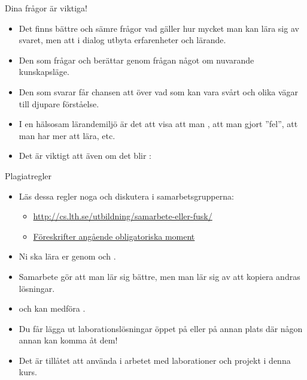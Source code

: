 \begin{SlideExtra}{Dina frågor är viktiga!}
\begin{itemize}
\item Det finns bättre och sämre frågor vad gäller hur mycket man kan lära sig av svaret, men  att i dialog utbyta erfarenheter och lärande.
\item Den som frågar  och berättar genom frågan något om nuvarande kunskapsläge.
\item Den som svarar får chansen att  över vad som kan vara svårt och olika vägar till djupare förståelse.
\item I en hälsosam lärandemiljö är det  att visa att man , att man gjort ''fel'', att man har mer att lära, etc.
\item Det är viktigt att  även om det blir :\\ 
\end{itemize}
\end{SlideExtra}

\begin{SlideExtra}{Plagiatregler}
\begin{itemize}
\item Läs dessa regler noga och diskutera i samarbetsgrupperna:

\begin{itemize}
\footnotesize
\item \url{http://cs.lth.se/utbildning/samarbete-eller-fusk/}
\item \href{http://cs.lth.se/utbildning/foereskrifter-angaaende-obligatoriska-moment/}{Föreskrifter angående obligatoriska moment}
\end{itemize}
\item Ni ska lära er genom  och  .
\item Samarbete gör att man lär sig bättre, men man lär sig  av att kopiera andras lösningar.
\item {} och kan medföra .
\item Du får  lägga ut laborationslösningar öppet på  eller på annan plats där någon annan kan komma åt dem!
\item Det är  tillåtet att använda  i arbetet med laborationer och projekt i denna kurs.
\end{itemize}

\end{SlideExtra}

